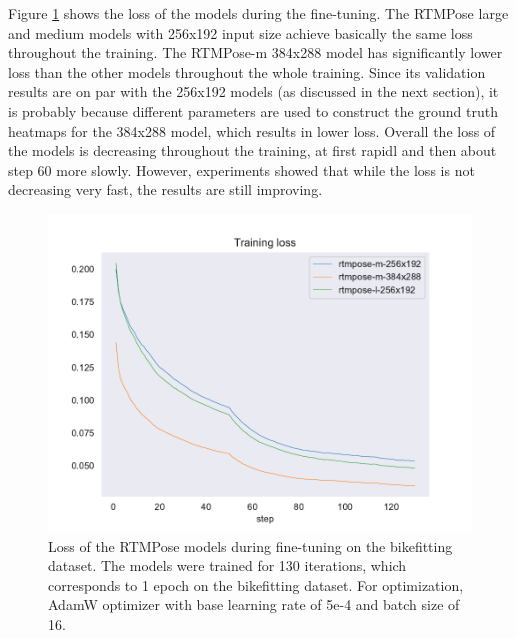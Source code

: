 Figure \ref{fig:fine_tuning_loss} shows the loss of the models during the fine-tuning. The RTMPose large and medium models with 256x192 input size achieve basically the same loss throughout the training. The RTMPose-m 384x288 model has significantly lower loss than the other models throughout the whole training. Since its validation results are on par with the 256x192 models (as discussed in the next section), it is probably because different parameters are used to construct the ground truth heatmaps for the 384x288 model, which results in lower loss. Overall the loss of the models is decreasing throughout the training, at first rapidl and then about step 60 more slowly. However, experiments showed that while the loss is not decreasing very fast, the results are still improving.
\begin{figure}

    \centering
    \includegraphics[width=1\linewidth]{obrazky-figures/loss.pdf}

    \caption{Loss of the RTMPose models during fine-tuning on the bikefitting dataset. The models were trained for 130 iterations, which corresponds to 1 epoch on the bikefitting dataset. For optimization, AdamW optimizer with base learning rate of 5e-4 and batch size of 16.}
    \label{fig:fine_tuning_loss}
\end{figure}


